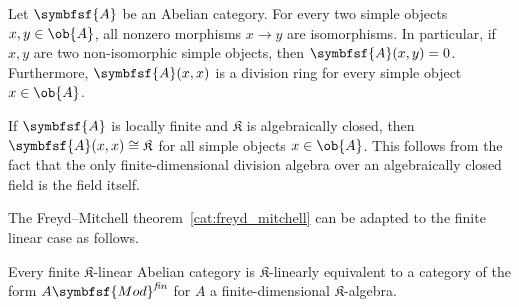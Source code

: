 
    \begin{theorem}\label{cat:schur_lemma}
        Let $\symbfsf{A}$ be an Abelian category. For every two simple objects $x,y\in\ob{A}$, all nonzero morphisms $x\rightarrow y$ are isomorphisms. In particular, if $x,y$ are two non-isomorphic simple objects, then $\symbfsf{A}(x,y)=0$. Furthermore, $\symbfsf{A}(x,x)$ is a division ring for every simple object $x\in\ob{A}$.
    \end{theorem}
    \begin{result}
        If $\symbfsf{A}$ is locally finite and $\mathfrak{K}$ is algebraically closed, then $\symbfsf{A}(x,x)\cong\mathfrak{K}$ for all simple objects $x\in\ob{A}$. This follows from the fact that the only finite-dimensional division algebra over an algebraically closed field is the field itself.
    \end{result}

    The Freyd--Mitchell theorem~\ref{cat:freyd_mitchell} can be adapted to the finite linear case as follows.
    \begin{theorem}[Deligne]
        Every finite $\mathfrak{K}$-linear Abelian category is $\mathfrak{K}$-linearly equivalent to a category of the form $A\symbfsf{Mod}^{\emph{fin}}$ for $A$ a finite-dimensional $\mathfrak{K}$-algebra.
    \end{theorem}

